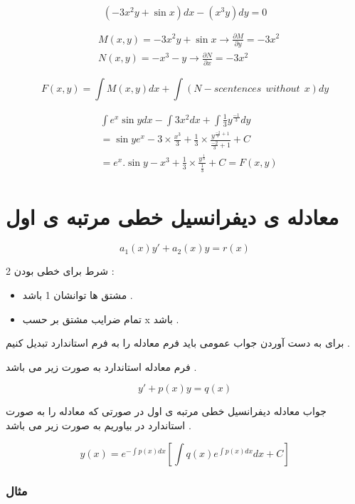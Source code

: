 \documentclass[12pt]{book}
\begin{document}
$$
( -3x^{2}y + \sin{x} )dx - ( x^{3} y )dy = 0
$$

\begin{align*}
& M(x,y) = - 3x^{2}y + \sin{x} \to \frac{\partial{M}}{\partial{y}} = -3x^{2} \\
& N(x,y) = - x^{3} - y \to \frac{\partial{N}}{\partial{x}} = - 3x^{2} 
\end{align*}

$$
F(x,y) = \int{M(x,y)dx} + \int{(N - scentences \:\: without \:\: x) dy}
$$

\begin{align*}
& \int{e^{x} \sin{y} dx} - \int{3x^{2} dx} + \int{\frac{1}{3} y^{\frac{-1}{3}} dy } \\
&= \sin{y} e^{x} - 3 \times  \frac{x^{3}}{3} + \frac{1}{3} \times \frac{y^{\frac{-2}{3} + 1}}{\frac{-2}{3} + 1} + C \\
&= e^{x} . \sin{y} - x^{3} + \frac{1}{3} \times \frac{y^{\frac{1}{3}}}{\frac{1}{3}} + C = F(x,y) 
\end{align*}


\section{معادله ی دیفرانسیل خطی مرتبه ی اول}

$$
a_{1}(x)y' + a_{2}(x)y = r(x)
$$

\begin{tcolorbox}
2 شرط برای خطی بودن :
\begin{itemize}
	\item مشتق ها توانشان 1 باشد .
	\item تمام ضرایب مشتق بر حسب x باشد .
\end{itemize}
\end{tcolorbox}

برای به دست آوردن جواب عمومی باید فرم معادله را به فرم استاندارد تبدیل کنیم .

فرم معادله استاندارد به صورت زیر می باشد .

$$
y' + p(x) y = q(x)
$$

جواب معادله دیفرانسیل خطی مرتبه ی اول در صورتی که معادله را به صورت استاندارد در بیاوریم به صورت زیر می باشد .

\begin{tcolorbox}
$$
y(x) = e^{- \displaystyle\int{p(x)dx}} \left[ \int{q(x) e ^{ {\displaystyle\int{p(x)dx}}}dx } + C \right]
$$
\end{tcolorbox}


\subsubsection{مثال}
\end{document}
